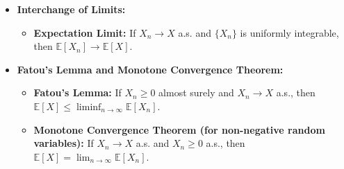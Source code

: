 \documentclass{report}
\begin{document}
\begin{itemize}
	\item \textbf{Interchange of Limits:}
	\begin{itemize}
		\item \textbf{Expectation Limit:} If $X_n \to X$ a.s. and $\{X_n\}$ is uniformly integrable, then $\mathbb{E}[X_n] \to \mathbb{E}[X]$.
	\end{itemize}
	
	\item \textbf{Fatou's Lemma and Monotone Convergence Theorem:}
	\begin{itemize}
		\item \textbf{Fatou’s Lemma:} If $X_n \geq 0$ almost surely and $X_n \to X$ a.s., then $\mathbb{E}[X] \leq \liminf_{n \to \infty} \mathbb{E}[X_n]$.
		\item \textbf{Monotone Convergence Theorem (for non-negative random variables):} If $X_n \to X$ a.s. and $X_n \geq 0$ a.s., then $\mathbb{E}[X] = \lim_{n \to \infty} \mathbb{E}[X_n]$.
	\end{itemize}
\end{itemize}
\end{document}
